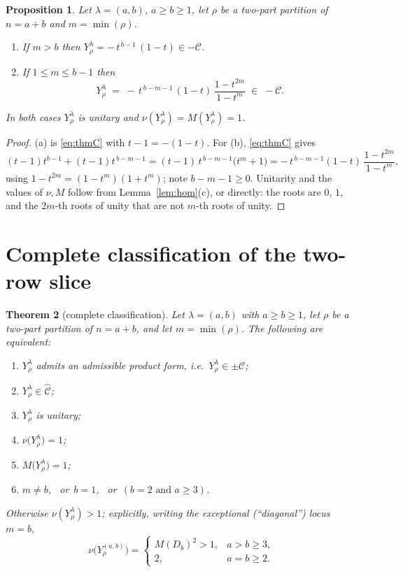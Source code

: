 \documentclass[11pt]{article}
\newtheorem{theorem}{Theorem}[section]
\newtheorem{proposition}[theorem]{Proposition}
\theoremstyle{definition}
\newcommand{\lam}{\lambda}
\newcommand{\Chat}{\widehat{\mathcal{C}}}
\begin{document}
\begin{proposition}\label{prop:offdiag}
Let $\lam=(a,b)$, $a\ge b\ge1$, let $\rho$ be a two-part partition of $n=a+b$ and $m=\min(\rho)$.
\begin{enumerate}
\item[(a)] If $m>b$ then $Y^{\lam}_\rho=-\,t^{\,b-1}\,(1-t)\in-\mathcal{C}$.
\item[(b)] If $1\le m\le b-1$ then
  \[
    Y^{\lam}_\rho \;=\; -\,t^{\,b-m-1}\,(1-t)\,\frac{1-t^{2m}}{1-t^{m}}\;\in\;-\mathcal{C}.
  \]
\end{enumerate}
In both cases $Y^\lam_\rho$ is unitary and $\nu(Y^\lam_\rho)=M(Y^\lam_\rho)=1$.
\end{proposition}

\begin{proof}
(a) is \eqref{eq:thmC} with $t-1=-(1-t)$. For (b), \eqref{eq:thmC} gives
\[
  (t-1)t^{b-1}+(t-1)t^{\,b-m-1}
  =(t-1)\,t^{\,b-m-1}\bigl(t^{m}+1\bigr)
  =-\,t^{\,b-m-1}(1-t)\,\frac{1-t^{2m}}{1-t^{m}},
\]
using $1-t^{2m}=(1-t^{m})(1+t^{m})$; note $b-m-1\ge0$. Unitarity and the values of $\nu,M$ follow
from Lemma~\ref{lem:hom}(c), or directly: the roots are $0$, $1$, and the $2m$-th roots of unity
that are not $m$-th roots of unity.
\end{proof}

\section{Complete classification of the two-row slice}

\begin{theorem}[complete classification]\label{thm:classify}
Let $\lam=(a,b)$ with $a\ge b\ge1$, let $\rho$ be a two-part partition of $n=a+b$, and let
$m=\min(\rho)$. The following are equivalent:
\begin{enumerate}
\item[(i)] $Y^{\lam}_{\rho}$ admits an admissible product form, i.e.\ $Y^\lam_\rho\in\pm\mathcal{C}$;
\item[(ii)] $Y^{\lam}_{\rho}\in\Chat$;
\item[(iii)] $Y^{\lam}_{\rho}$ is unitary;
\item[(iv)] $\nu\bigl(Y^{\lam}_{\rho}\bigr)=1$;
\item[(v)] $M\bigl(Y^{\lam}_{\rho}\bigr)=1$;
\item[(vi)] $m\ne b$, \ or\ $b=1$, \ or\ $(b=2 \text{ and } a\ge3)$.
\end{enumerate}
Otherwise $\nu(Y^\lam_\rho)>1$; explicitly, writing the exceptional (``diagonal'') locus
$m=b$,
\[
  \nu\bigl(Y^{(a,b)}_{\rho}\bigr)=
  \begin{cases}
    M(D_b)^{2}>1, & a>b\ge3,\\
    2, & a=b\ge2 .
  \end{cases}
\]
\end{theorem}
\end{document}

